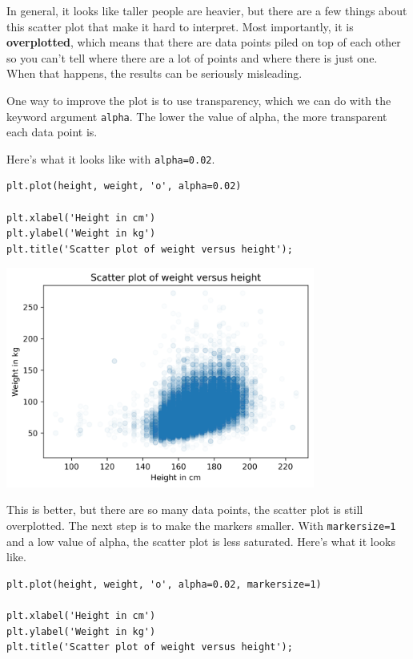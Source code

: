 In general, it looks like taller people are heavier, but there are a few
things about this scatter plot that make it hard to interpret. Most
importantly, it is \textbf{overplotted}, which means that there are data
points piled on top of each other so you can't tell where there are a
lot of points and where there is just one. When that happens, the
results can be seriously misleading.

One way to improve the plot is to use transparency, which we can do with
the keyword argument \passthrough{\lstinline!alpha!}. The lower the
value of alpha, the more transparent each data point is.

Here's what it looks like with \passthrough{\lstinline!alpha=0.02!}.

\begin{lstlisting}[]
plt.plot(height, weight, 'o', alpha=0.02)

plt.xlabel('Height in cm')
plt.ylabel('Weight in kg')
plt.title('Scatter plot of weight versus height');
\end{lstlisting}

\begin{center}
\includegraphics[width=4in]{chapters/09_relationships_files/09_relationships_15_0.png}
\end{center}

This is better, but there are so many data points, the scatter plot is
still overplotted. The next step is to make the markers smaller. With
\passthrough{\lstinline!markersize=1!} and a low value of alpha, the
scatter plot is less saturated. Here's what it looks like.

\begin{lstlisting}[]
plt.plot(height, weight, 'o', alpha=0.02, markersize=1)

plt.xlabel('Height in cm')
plt.ylabel('Weight in kg')
plt.title('Scatter plot of weight versus height');
\end{lstlisting}

